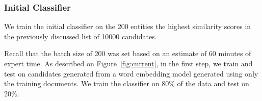 
\subsubsection{Initial Classifier}

We train the initial classifier on the 200 entities 
the highest similarity scores
in the previously discussed list of
\num{10000} candidates.

Recall that the batch size of 200 was set based on an estimate of 60 minutes of expert time.
As described on Figure~\ref{fig:current}, in the first step, we train and test on candidates generated from a word embedding model generated using only the training documents. 
We train the classifier on 80\% of the data and test on 20\%.

